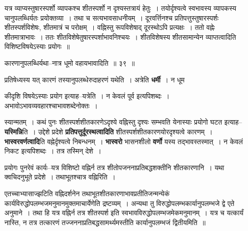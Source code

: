 \documentclass[article,12pt,a4paper]{memoir}
\begin{document}
	  \pstart यत्र व्याप्यस्तुषारस्पर्शो व्यापकश्च शीतस्पर्शो न दृश्यस्तत्रायं हेतुः । तयोर्दृश्यत्वे स्वभावस्य व्यापकस्य चानुपलब्धिर्यतः प्रयोक्तव्या । तथा च सत्यभावसाधनीयम् । दूरवर्त्तिनश्च प्रतिपत्तुस्तुषारस्पर्शः शीतस्पर्शविशेषः, शीतमात्रं च परोक्षम् । वह्निस्तु रूपविशेषाद् दूरस्थोऽपि प्रत्यक्षः । ततो वह्नेः शीतमात्राभावः । ततः शीतविशेषेतुषारस्पर्शाभावनिश्चयः । शीतविशेषस्य शीतसामान्येन व्याप्तत्वादिति विशिष्टविषयेऽस्याः प्रयोगः ॥
	\pend
        
	  \bigskip
	  \begingroup
	

	  \pstart कारणानुपलब्धिर्यथा--नात्र धूमो वहायभावादिति ॥ ३९ ॥
	\pend
      
	  \endgroup
	 

	  \pstart प्रतिषेध्यस्य यत् कारणं तस्यानुपलब्धेरुदाहरणं यथेति । अत्रेति \textbf{धर्मी} । न धूम
	\pend
      
	  \endgroup
	

	  \pstart कीदृशि विषयेऽस्याः प्रयोग इत्याह--यत्रेति । न केवलं पूर्व इत्यपिशब्दः । अभावोऽभावव्यवहारश्चाभावशब्देनोक्तः ।
	\pend
      

	  \pstart स्यान्मतम् । कथं पुनः शीतस्पर्शशीतकारणेऽदृश्ये वह्निस्तु दृश्यः सम्भवति येनास्याः प्रयोगो घटत इत्याह--\textbf{यस्मिन्नि}ति । उद्देशे प्रदेशे \textbf{प्रतिपत्तुर्दूरस्थत्वादिति} शीतस्पर्शशीतकारणयोरदृश्यत्वे कारणम् । \textbf{भास्वरवर्णत्वादि}ति वह्नेर्दृश्यत्वे निबन्धनम् । \textbf{भास्वरो} भासनशीलो \textbf{वर्णो} यस्य तद्भावस्तस्मात् । न केवलं निकट इत्यपिशब्दः । तत्र तस्मिन् देशे ।
	\pend
      

	  \pstart प्रयोगः पुनरेवं कार्यः--यत्र विशिष्टो वह्निर्न तत्र शीतोपजननाप्रतिबद्धशक्तीनि शीतकारणानि । यथा क्वचिदनुभूते प्रदेशे । तथाभूतश्चात्र वह्निरिति ।
	\pend
      

	  \pstart एतच्चाभ्यासाज्झटिति वह्निदर्शनेन तथाभूतशीतकारणाभावप्रतीतिजन्मन्येकं कार्यविरुद्धोपलम्भजमनुमानमुक्तमाचार्येणेति द्रष्टव्यम् । अन्यथा तु विरुद्धोपलम्भकार्यानुपलम्भजे द्वे एते अनुमाने । तथा हि यत्र वह्निर्न तत्र शीतस्पर्श इति स्वभावविरुद्धोपलम्भजमेकमनुमानम् । यत्र च यत्कार्यं नास्ति, न तत्र तत्कारणं तज्जननाप्रतिबद्धसामर्थ्यमस्तीति कार्यानुपलम्भजं द्वितीयमिति ॥
	\pend
	  \bigskip
	  \begingroup
	
\end{document}

